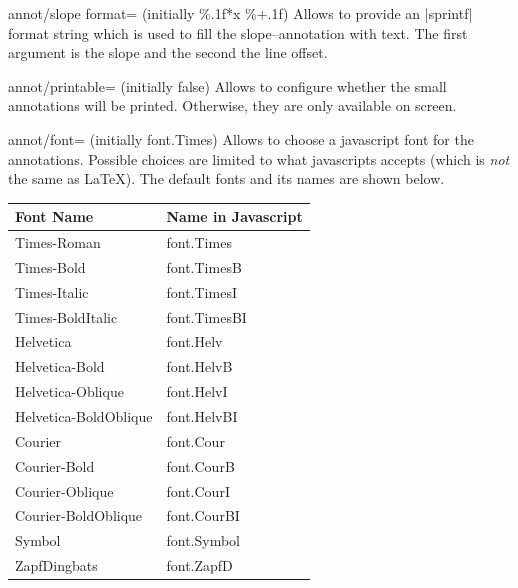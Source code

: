 \begin{pgfplotskey}{annot/slope format= (initially \%.1f*x \%+.1f)}
	Allows to provide an |sprintf| format string which is used to fill the slope--annotation with text.
	The first argument is the slope and the second the line offset.
\end{pgfplotskey}

\begin{pgfplotskey}{annot/printable= (initially false)}
	Allows to configure whether the small annotations will be printed. Otherwise, they are only available on screen.
\end{pgfplotskey}

\begin{pgfplotskey}{annot/font= (initially font.Times)}
	Allows to choose a javascript font for the annotations. Possible choices are limited to what javascripts accepts (which is \emph{not} the same as \LaTeX). The default fonts and its names are shown below.

	\begin{center}
	\begin{tabular}{ll}
		\toprule
		Font Name	& Name in Javascript\\
		\midrule
		Times-Roman           & font.Times\\
        Times-Bold            & font.TimesB\\
        Times-Italic          & font.TimesI\\
        Times-BoldItalic      & font.TimesBI\\
        Helvetica             & font.Helv\\
        Helvetica-Bold        & font.HelvB\\
        Helvetica-Oblique     & font.HelvI\\
        Helvetica-BoldOblique & font.HelvBI\\
        Courier               & font.Cour\\
        Courier-Bold          & font.CourB\\
        Courier-Oblique       & font.CourI\\
        Courier-BoldOblique   & font.CourBI\\
        Symbol                & font.Symbol\\
        ZapfDingbats          & font.ZapfD\\
		\bottomrule
	\end{tabular}
	\end{center}
\end{pgfplotskey}

